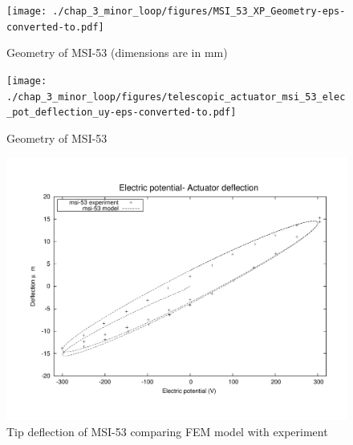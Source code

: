 \begin{figure}
\centering
\texttt{[image: ./chap\_3\_minor\_loop/figures/MSI\_53\_XP\_Geometry-eps-converted-to.pdf]}
\caption{Geometry of MSI-53 (dimensions are in mm)}
\label{fig:MSI_53_Geometry}
\end{figure}


\begin{figure}
\centering
\texttt{[image: ./chap\_3\_minor\_loop/figures/telescopic\_actuator\_msi\_53\_elec\_pot\_deflection\_uy-eps-converted-to.pdf]}
\caption{Geometry of MSI-53}   
\label{fig:MSI_53_XP_contour}  
\end{figure}
 

\begin{figure}
\centering
\includegraphics[width=5.0in]{./chap_3_minor_loop/figures/result_msi-53.pdf}
\caption{Tip deflection of MSI-53 comparing FEM model with experiment}
\label{fig:MSI_53_XP_results}
\end{figure}